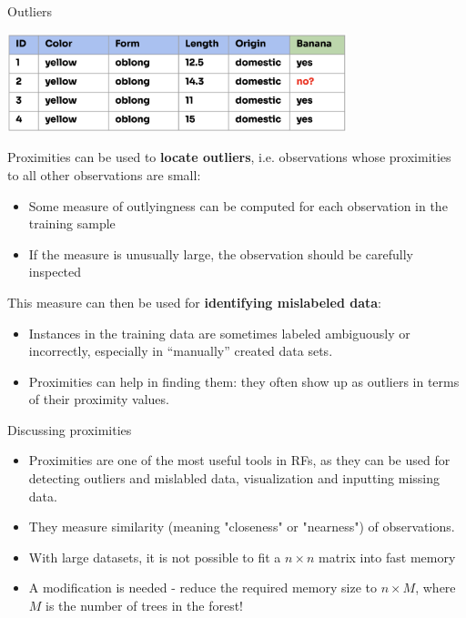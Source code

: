 \documentclass[11pt,compress,t,notes=noshow, xcolor=table]{beamer}
\begin{document}
\begin{vbframe}{Outliers}
\vspace{-2ex}
\begin{center}
\includegraphics[width=0.74\textwidth]{figure_man/forest-mislabeled_data.png}
\end{center}

Proximities can be used to \textbf{locate outliers}, i.e. observations whose proximities to all other observations are small: 
\begin{itemize}
\item Some measure of outlyingness can be computed for each observation in the training sample
\item If the measure is unusually large, the observation should be carefully inspected
\end{itemize}

This measure can then be used for \textbf{identifying mislabeled data}:
\begin{itemize}
\item Instances in the training data are sometimes labeled ambiguously or incorrectly, especially in \enquote{manually} created data sets.
\item Proximities can help in finding them: they often show up as outliers in terms of their proximity values. 
\end{itemize}
\end{vbframe}

\begin{vbframe}{Discussing proximities}
\begin{itemize}
  \item Proximities are one of the most useful tools in RFs, as they can be used for detecting outliers and mislabled data, visualization and inputting missing data.
  \item They measure similarity (meaning "closeness" or "nearness") of observations.
  \item With large datasets, it is not possible to fit a $n \times n$ matrix into fast memory
  \item A modification is needed - reduce the required memory size to $n \times M$, where $M$ is the number of trees in the forest!
\end{itemize}
\end{vbframe}

\endlecture
\end{document}
